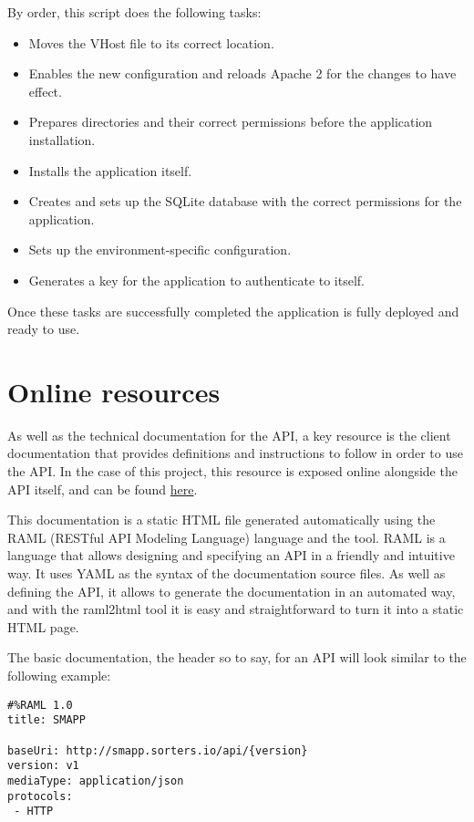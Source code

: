 By order, this script does the following tasks:

\begin{itemize}
\item Moves the VHost file to its correct location.
\item Enables the new configuration and reloads Apache 2 for the changes to have effect.
\item Prepares directories and their correct permissions before the application installation.
\item Installs the application itself.
\item Creates and sets up the SQLite database with the correct permissions for the application.
\item Sets up the environment-specific configuration.
\item Generates a key for the application to authenticate to itself.
\end{itemize}

Once these tasks are successfully completed the application is fully deployed and ready to use.

\section{Online resources}
As well as the technical documentation for the API, a key resource is the client documentation that provides definitions and instructions to follow in order to use the API. In the case of this project, this resource is exposed online alongside the API itself, and can be found \href{http://smapp.sorters.io/docs}{here}.

This documentation is a static HTML file generated automatically using the RAML (RESTful API Modeling Language) language and the  tool. RAML is a language that allows designing and specifying an API in a friendly and intuitive way. It uses YAML as the syntax of the documentation source files. As well as defining the API, it allows to generate the documentation in an automated way, and with the raml2html tool it is easy and straightforward to turn it into a static HTML page.

The basic documentation, the header so to say, for an API will look similar to the following example:

\begin{verbatim}
#%RAML 1.0
title: SMAPP

baseUri: http://smapp.sorters.io/api/{version}
version: v1
mediaType: application/json
protocols:
 - HTTP
\end{verbatim}

